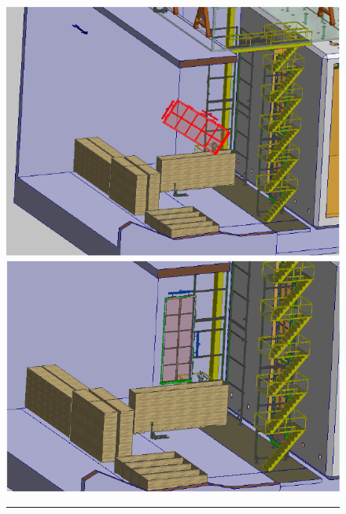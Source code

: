 \begin{figure}[htbp]
\begin{center}
\begin{minipage}[c]{0.32\textwidth}
\end{minipage}
\begin{minipage}[c]{0.32\textwidth}
\includegraphics[width=\textwidth]{far-detector-single-phase/figures/APA-2.pdf}
\end{minipage}
\begin{minipage}[c]{0.32\textwidth}
\includegraphics[width=\textwidth]{far-detector-single-phase/figures/APA-3.pdf}
\end{minipage}
%
\vspace{5mm}
\hrule
\vspace{5mm}
%
\begin{minipage}[c]{0.32\textwidth}

\end{minipage}
\end{center}
\end{figure}
